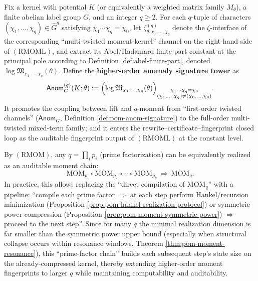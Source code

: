 \begin{definition}\label{def:pom-anom-signature-tower}
Fix a kernel with potential \(K\) (or equivalently a weighted matrix family \(M_\theta\)), a finite abelian label group \(G\), and an integer \(q\ge 2\).
For each \(q\)-tuple of characters \((\chi_1,\dots,\chi_q)\in\widehat G^q\) satisfying \(\chi_1\cdots\chi_q=\chi_0\), let
\(\zeta^{(q)}_{\theta,\chi_1,\dots,\chi_q}\)
denote the \(\zeta\)-interface of the corresponding ``multi-twisted moment-kernel'' channel on the right-hand side of \((\mathrm{RMOML})\), and extract its Abel/Hadamard finite-part constant at the principal pole according to Definition \ref{def:abel-finite-part}, denoted \(\log\mathfrak{M}_{\chi_1,\dots,\chi_q}(\theta)\).
Define the \textbf{higher-order anomaly signature tower} as
\[
\mathsf{Anom}^{(q)}_{G}(K;\theta)
:=\Bigl(\log\mathfrak{M}_{\chi_1,\dots,\chi_q}(\theta)\Bigr)_{\substack{\chi_1\cdots\chi_q=\chi_0\\ (\chi_1,\dots,\chi_q)\neq(\chi_0,\dots,\chi_0)}}.
\]
It promotes the coupling between lift and \(q\)-moment from ``first-order twisted channels'' (\(\mathsf{Anom}_G\), Definition \ref{def:pom-anom-signature}) to the full-order multi-twisted mixed-term family; and it enters the rewrite--certificate--fingerprint closed loop as the auditable fingerprint output of \((\mathrm{RMOML})\) at the constant level.
\end{definition}

\begin{remark}\label{rem:pom-mom-prime-factor-compiler}
By \((\mathrm{RMOM})\), any \(q=\prod_i p_i\) (prime factorization) can be equivalently realized as an auditable moment chain:
\[
\mathrm{MOM}_{p_1}\circ\mathrm{MOM}_{p_2}\circ\cdots\circ\mathrm{MOM}_{p_k}
\ \Rightarrow\ \mathrm{MOM}_q.
\]
In practice, this allows replacing the ``direct compilation of \(\mathrm{MOM}_q\)'' with a pipeline: ``compile each prime factor \(\Rightarrow\) at each step perform Hankel/recursion minimization (Proposition \ref{prop:pom-hankel-realization-protocol}) or symmetric power compression (Proposition \ref{prop:pom-moment-symmetric-power}) \(\Rightarrow\) proceed to the next step''.
Since for many \(q\) the minimal realization dimension is far smaller than the symmetric power upper bound (especially when structural collapse occurs within resonance windows, Theorem \ref{thm:pom-moment-resonance}), this ``prime-factor chain'' builds each subsequent step's state size on the already-compressed kernel, thereby extending higher-order moment fingerprints to larger \(q\) while maintaining computability and auditability.
\end{remark}

